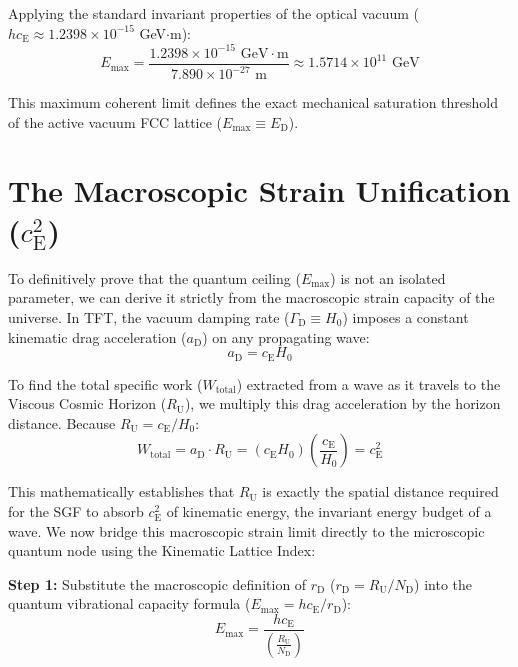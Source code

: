 Applying the standard invariant properties of the optical vacuum ($h c_{\mathrm{E}} \approx 1.2398 \times 10^{-15}$ GeV$\cdot$m):
\begin{equation}
    E_{\mathrm{max}} = \frac{1.2398 \times 10^{-15} \text{ GeV}\cdot\text{m}}{7.890 \times 10^{-27} \text{ m}} \approx 1.5714 \times 10^{11} \text{ GeV}
\end{equation}

This maximum coherent limit defines the exact mechanical saturation threshold of the active vacuum FCC lattice ($E_{\mathrm{max}} \equiv E_{\mathrm{D}}$).

\section{The Macroscopic Strain Unification ($c_{\mathrm{E}}^2$)}
To definitively prove that the quantum ceiling ($E_{\mathrm{max}}$) is not an isolated parameter, we can derive it strictly from the macroscopic strain capacity of the universe. In TFT, the vacuum damping rate ($\Gamma_{\mathrm{D}} \equiv H_0$) imposes a constant kinematic drag acceleration ($a_{\mathrm{D}}$) on any propagating wave:
\begin{equation}
    a_{\mathrm{D}} = c_{\mathrm{E}} H_0
\end{equation}

To find the total specific work ($W_{\mathrm{total}}$) extracted from a wave as it travels to the Viscous Cosmic Horizon ($R_{\mathrm{U}}$), we multiply this drag acceleration by the horizon distance. Because $R_{\mathrm{U}} = c_{\mathrm{E}}/H_0$:
\begin{equation}
    W_{\mathrm{total}} = a_{\mathrm{D}} \cdot R_{\mathrm{U}} = (c_{\mathrm{E}} H_0)\left(\frac{c_{\mathrm{E}}}{H_0}\right) = c_{\mathrm{E}}^2
\end{equation}

This mathematically establishes that $R_{\mathrm{U}}$ is exactly the spatial distance required for the SGF to absorb $c_{\mathrm{E}}^2$ of kinematic energy, the invariant energy budget of a wave. We now bridge this macroscopic strain limit directly to the microscopic quantum node using the Kinematic Lattice Index:

\vspace{0.5em}
\noindent\textbf{Step 1:} Substitute the macroscopic definition of $r_{\mathrm{D}}$ ($r_{\mathrm{D}} = R_{\mathrm{U}} / N_{\mathrm{D}}$) into the quantum vibrational capacity formula ($E_{\mathrm{max}} = h c_{\mathrm{E}}/r_{\mathrm{D}}$):
\begin{equation}
    E_{\mathrm{max}} = \frac{h c_{\mathrm{E}}}{\left( \frac{R_{\mathrm{U}}}{N_{\mathrm{D}}} \right)}
\end{equation}

